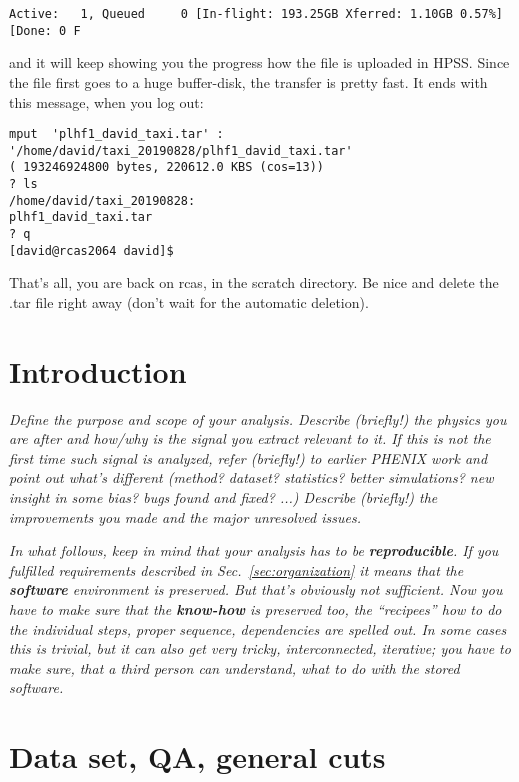 \documentclass[12pt]{article}
\begin{document}
\begin{description}
\begin{verbatim}
Active:   1, Queued     0 [In-flight: 193.25GB Xferred: 1.10GB 0.57%] [Done: 0 F    
\end{verbatim}
and it will keep showing you the progress how the file is uploaded in HPSS.
Since the file first goes to a huge buffer-disk, the transfer is
pretty fast.  It ends with this message, when you log out:
\begin{verbatim}
mput  'plhf1_david_taxi.tar' :
'/home/david/taxi_20190828/plhf1_david_taxi.tar' 
( 193246924800 bytes, 220612.0 KBS (cos=13))
? ls
/home/david/taxi_20190828:
plhf1_david_taxi.tar
? q
[david@rcas2064 david]$
\end{verbatim}
That's all, you are back on rcas, in the scratch directory.  Be nice
and delete the .tar file right away (don't wait for the automatic
deletion). 
\end{description}

\newpage

\section{Introduction}

{\it 
  Define the purpose and scope of your analysis.  Describe (briefly!)
  the physics you are after and how/why is the signal you extract
  relevant to it.  If this is not the first time such signal is
  analyzed, refer (briefly!) to earlier PHENIX work and point out
  what's different (method? dataset? statistics? better simulations?
  new insight in some bias?  bugs found and fixed? ...)
  Describe (briefly!) the improvements you made and the major
  unresolved issues.
}

{\it In what follows, keep in mind that your analysis has to be 
  {\bf reproducible}.  If you fulfilled requirements described in
  Sec.~\ref{sec:organization} it means that the {\bf software} environment is
  preserved.  But that's obviously not sufficient. 
  Now you have to make sure that the {\bf know-how} is
  preserved too, the ``recipees'' how to do the individual steps,
  proper sequence, dependencies are spelled out.  In some cases this
  is trivial, but it can also get very tricky, interconnected,
  iterative; you have to make sure, that a third person can
  understand, what to do with the stored software.
}

\section{Data set, QA, general cuts}
\end{document}

